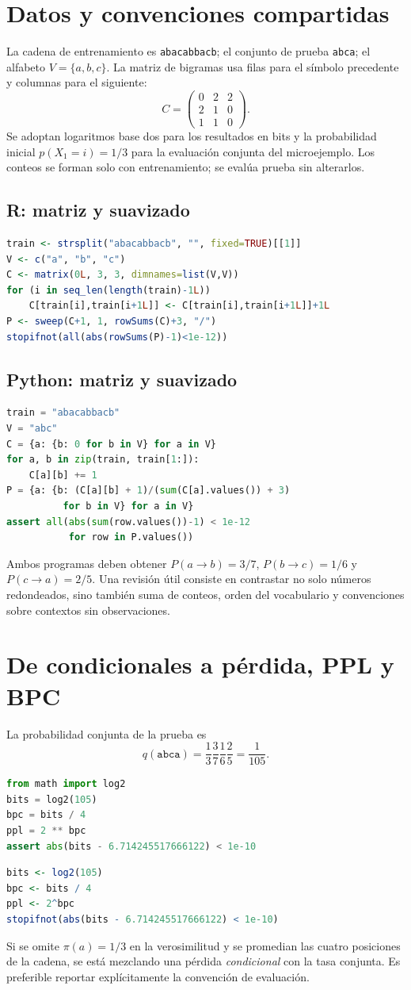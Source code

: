 \chapter{Datos y convenciones compartidas}
La cadena de entrenamiento es \texttt{abacabbacb}; el conjunto de prueba
\texttt{abca}; el alfabeto $V=\{a,b,c\}$. La matriz de bigramas usa
filas para el símbolo precedente y columnas para el siguiente:
\[
C=\begin{pmatrix}0&2&2\\2&1&0\\1&1&0\end{pmatrix}.
\]
Se adoptan logaritmos base dos para los resultados en bits y la
probabilidad inicial $p(X_1=i)=1/3$ para la evaluación conjunta del
microejemplo. Los conteos se forman solo con entrenamiento; se evalúa
prueba sin alterarlos.
\section{R: matriz y suavizado}
\begin{lstlisting}[language=R]
train <- strsplit("abacabbacb", "", fixed=TRUE)[[1]]
V <- c("a", "b", "c")
C <- matrix(0L, 3, 3, dimnames=list(V,V))
for (i in seq_len(length(train)-1L))
    C[train[i],train[i+1L]] <- C[train[i],train[i+1L]]+1L
P <- sweep(C+1, 1, rowSums(C)+3, "/")
stopifnot(all(abs(rowSums(P)-1)<1e-12))
\end{lstlisting}
\section{Python: matriz y suavizado}
\begin{lstlisting}[language=Python]
train = "abacabbacb"
V = "abc"
C = {a: {b: 0 for b in V} for a in V}
for a, b in zip(train, train[1:]):
    C[a][b] += 1
P = {a: {b: (C[a][b] + 1)/(sum(C[a].values()) + 3)
          for b in V} for a in V}
assert all(abs(sum(row.values())-1) < 1e-12
           for row in P.values())
\end{lstlisting}
Ambos programas deben obtener
$P(a\to b)=3/7$, $P(b\to c)=1/6$ y $P(c\to a)=2/5$.
Una revisión útil consiste en contrastar no solo números redondeados,
sino también suma de conteos, orden del vocabulario y convenciones
sobre contextos sin observaciones.
\chapter{De condicionales a pérdida, PPL y BPC}
La probabilidad conjunta de la prueba es
\[
q(\texttt{abca})=\frac13\frac37\frac16\frac25=\frac1{105}.
\]
\begin{lstlisting}[language=Python]
from math import log2
bits = log2(105)
bpc = bits / 4
ppl = 2 ** bpc
assert abs(bits - 6.714245517666122) < 1e-10
\end{lstlisting}
\begin{lstlisting}[language=R]
bits <- log2(105)
bpc <- bits / 4
ppl <- 2^bpc
stopifnot(abs(bits - 6.714245517666122) < 1e-10)
\end{lstlisting}
Si se omite $\pi(a)=1/3$ en la verosimilitud y se promedian las
cuatro posiciones de la cadena, se está mezclando una pérdida
\emph{condicional} con la tasa conjunta. Es preferible reportar
explícitamente la convención de evaluación.
